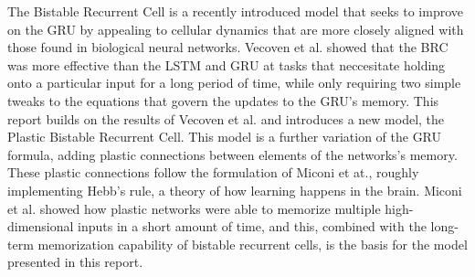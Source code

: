 The Bistable Recurrent Cell is a recently introduced model that seeks to improve on the GRU by appealing to cellular dynamics that are more closely aligned with those found in biological neural networks. Vecoven et al.\cite{vecoven2021brc} showed that the BRC was more effective than the LSTM and GRU at tasks that neccesitate holding onto a particular input for a long period of time, while only requiring two simple tweaks to the equations that govern the updates to the GRU's memory.
This report builds on the results of Vecoven et al.\cite{vecoven2021brc} and introduces a new model, the Plastic Bistable Recurrent Cell. This model is a further variation of the GRU formula, adding plastic connections between elements of the networks's memory. These plastic connections follow the formulation of Miconi et at.\cite{miconi2018diffplas}, roughly implementing Hebb's rule, a theory of how learning happens in the brain. Miconi et al. showed how plastic networks were able to memorize multiple high-dimensional inputs in a short amount of time, and this, combined with the long-term memorization capability of bistable recurrent cells, is the basis for the model presented in this report.